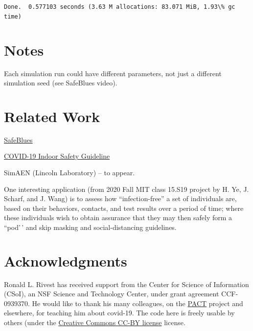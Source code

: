 \documentclass[11pt]{article}
\begin{document}
    \begin{center}
    \end{center}
    { \hspace*{\fill} \\}
    
    \begin{Verbatim}[commandchars=\\\{\}]

Done.  0.577103 seconds (3.63 M allocations: 83.071 MiB, 1.93\% gc time)
    \end{Verbatim}
\newpage
    \hypertarget{notes}{%
\section{Notes}\label{notes}}

Each simulation run could have different parameters, not just a
different simulation seed (see SafeBlues video).

    \hypertarget{related-work}{%
\section{Related Work}\label{related-work}}

\href{https://safeblues.org/}{SafeBlues}

\href{http://www.mit.edu/~bazant/COVID-19/}{COVID-19 Indoor Safety
Guideline}

SimAEN (Lincoln Laboratory) -- to appear.

One interesting application (from 2020 Fall MIT class 15.S19 project by
H. Ye, J. Scharf, and J. Wang) is to assess how ``infection-free'' a set
of individuals are, based on their behaviors, contacts, and test results
over a period of time; where these individuals wish to obtain assurance
that they may then safely form a ``pod'\,' and skip masking and
social-distancing guidelines.

    \hypertarget{acknowledgments}{%
\section{Acknowledgments}\label{acknowledgments}}

Ronald L. Rivest has received support from the Center for Science of
Information (CSoI), an NSF Science and Technology Center, under grant
agreement CCF-0939370. He would like to thank his many colleagues, on
the \href{http://pact.mit.edu}{PACT} project and elsewhere, for teaching
him about covid-19. The code here is freely usable by others (under the
\href{https://creativecommons.org/licenses/by/4.0/}{Creative Commons
CC-BY license} license.


    
    
    
\end{document}
